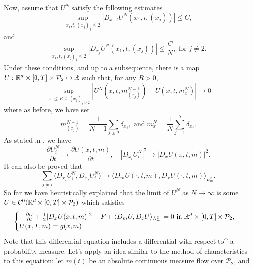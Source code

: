 Now, assume that $U^N$ satisfy the following estimates
\begin{equation}
    \sup_{x_1, t, (x_j)_j \leq 2} \left| D_{x_1, t} U^N (x_1, t, (x_j)) \right| \leq C,
\end{equation}
and
\begin{equation}
    \sup_{x_1, t, (x_j)_j \leq 2} \left| D_{x_j} U^N (x_1, t, (x_j)) \right| \leq  \frac{C}{N}, \text{ for } j\neq 2.
\end{equation}
Under these conditions, and up to a subsequence, there is a map 
$U : \mathbb{R}^d \times [0,T] \times \mathcal{P}_2 \mapsto \mathbb{R}$ such that,
for any $R > 0$,
\begin{equation}
    \sup_{|x| \leq R, t, (x_j)_{j\geq 2}} | U^N(x,t,m^{N-1}_{(x_j)}) - U(x,t,m^N_x) | \to 0
\end{equation}
where as before, we have set
\begin{equation}
    m^{N-1}_{(x_j)} = \frac{1}{N-1} \sum_{j \geq 2} \delta_{x_j}, \text{ and } m^N_x = \frac{1}{N} \sum_{j = 1}^N \delta_{x_j}.
\end{equation}
As stated in \cite{Cardaliaget}, we have
\begin{equation}
    \frac{\partial U^N_i}{\partial t} \to \frac{\partial U(x,t,m)}{\partial t}, \quad |D_{x_i} U_i^N|^2 \to |D_x U (x,t,m)|^2.
\end{equation}
It can also be proved \cite{Cardaliaget reference 53} that
\begin{equation}
    \sum_{j\neq i} \langle D_{x_j} U^N_j , D_{x_j} U^N_i \rangle \to \langle D_m U(\cdot,t,m), D_x U(\cdot, t, m) \rangle_{L^2_m}.
\end{equation}
So far we have heuristically explained that the limit of $U^N$ as $N \to \infty$
is some $U\in \mathcal{C}^0(\mathbb{R}^d \times [0,T] \times \mathcal{P}_2) $
 which satisfies 
 \begin{equation}\label{wass:simple_master_equation}
    \begin{cases}
        - \frac{\partial U}{ \partial t} + \frac{1}{2} |D_x U(x,t,m)|^2 - F + \langle D_m U, D_x U \rangle_{L^2_m} = 0\text{ in }\mathbb{R}^d \times [0,T] \times \mathcal{P}_2,\\
        U(x,T,m) = g(x,m)
    \end{cases}
 \end{equation}
 Note that this differential equation includes a differential with respect to^
 a probability measure.
  Let's apply an idea similar to the method of characteristics to this equation:
  let $m(t)$ be an absolute continuous measure flow over $\mathcal{P}_2$, and
